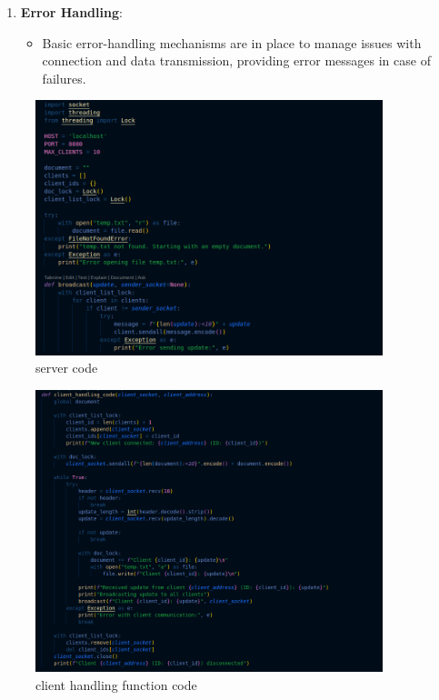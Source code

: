 \documentclass{exam}
\begin{document}
\begin{enumerate}
    \item \textbf{Error Handling}:
    \begin{itemize}
        \item Basic error-handling mechanisms are in place to manage issues with connection and data transmission, providing error messages in case of failures.
    \end{itemize}
\end{enumerate}


\begin{figure}[H]
    \centering
    \includegraphics[width=0.9\textwidth]{Q1_server_starting_code.png } 
    \caption{server code}
    \label{fig:output1}
\end{figure}


\begin{figure}[H]
    \centering
    \includegraphics[width=0.9\textwidth]{Q1_handling_client_Code.png } 
    \caption{ client handling function code}
    \label{fig:output1}
\end{figure}
\end{document}
